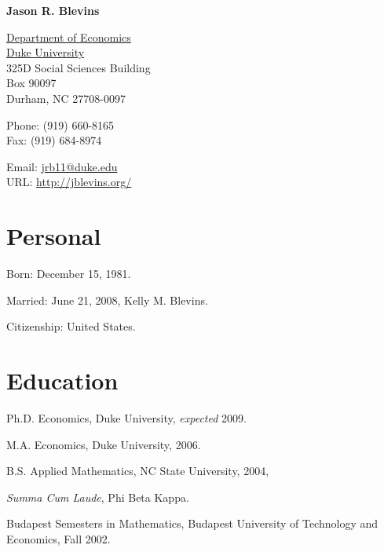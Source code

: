 \documentclass[11pt,letterpaper]{article}
\renewenvironment{itemize}{
  \begin{list}{}
    { \setlength{\itemsep}{5pt}
      \setlength{\parsep}{0pt}
      \setlength{\topsep}{0pt}
      \setlength{\leftmargin}{0em} } }{
  \end{list}}
\begin{document}
{\huge\bf Jason R. Blevins}

\bigskip

\href{http://www.econ.duke.edu/}{Department of Economics} \\
\href{http://www.duke.edu/}{Duke University} \\
325D Social Sciences Building \\
Box 90097 \\
Durham, NC 27708-0097

\medskip

Phone: (919) 660-8165 \\
Fax: (919) 684-8974

\medskip

Email: \href{mailto:jrb11@duke.edu}{jrb11@duke.edu} \\
URL: \href{http://jblevins.org/}{http://jblevins.org/}


\section*{Personal}

\begin{itemize}
\item Born: December 15, 1981.
\item Married: June 21, 2008, Kelly M. Blevins.
\item Citizenship: United States.
\end{itemize}


\section*{Education}

\begin{itemize}
  \item Ph.D. Economics, Duke University, \textit{expected} 2009.

  \item M.A. Economics, Duke University, 2006.

  \item B.S. Applied Mathematics, NC State University, 2004,
    \begin{itemize}
    \item {\it Summa Cum Laude}, Phi Beta Kappa.
    \end{itemize}

  \item Budapest Semesters in Mathematics, Budapest University of Technology
    and Economics, Fall 2002.
\end{itemize}
\end{document}

